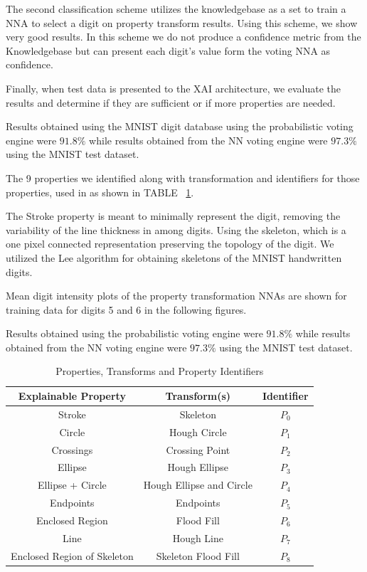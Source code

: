 \documentclass[conference]{IEEEtran}
\begin{document}
The second classification scheme utilizes the knowledgebase as a set to train a NNA to select a digit on property transform results.  Using this scheme, we show very good results.  In this scheme we do not produce a confidence metric from the Knowledgebase but can present each digit's value form the voting NNA as confidence.

Finally, when test data is presented to the XAI architecture, we evaluate the results and determine if they are sufficient or if more properties are needed.

Results obtained using the MNIST digit database using the probabilistic voting engine were $91.8\%$ while results obtained from the NN voting engine were $97.3\%$ using the MNIST test dataset.

The 9 properties we identified along with transformation and identifiers for those properties, used in as shown in TABLE ~\ref{table:tblproptrans}.

The Stroke property is meant to minimally represent the digit, removing the variability of the line thickness in among digits.  Using the skeleton, which is a one pixel connected representation preserving the topology of the digit.  We utilized the Lee\cite{Lee1994} algorithm for obtaining skeletons of the MNIST handwritten digits.

Mean digit intensity plots of the property transformation NNAs are shown for training data for digits 5 and 6 in the following figures.

Results obtained using the probabilistic voting engine were $91.8\%$ while results obtained from the NN voting engine were $97.3\%$ using the MNIST test dataset.

\begin{table}
\caption{Properties, Transforms and Property Identifiers}
\centering
\begin{tabular}{| c | c | c |}
\hline
 Explainable Property & Transform(s) & Identifier \\
\hline\hline
Stroke & Skeleton & $P_0$ \\
\hline
Circle & Hough Circle & $P_1$ \\
\hline
Crossings & Crossing Point & $P_2$ \\
\hline
Ellipse & Hough Ellipse & $P_3$ \\
\hline
Ellipse + Circle & Hough Ellipse and Circle & $P_4$ \\
\hline
Endpoints & Endpoints & $P_5$ \\
\hline
Enclosed Region & Flood Fill & $P_6$ \\
\hline
Line & Hough Line & $P_7$ \\
\hline
Enclosed Region of Skeleton & Skeleton Flood Fill & $P_8$ \\
\hline
\end{tabular}
\label{table:tblproptrans}
\end{table}
\end{document}
